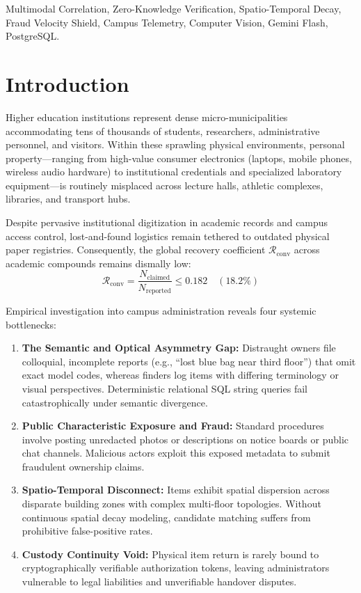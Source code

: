 \documentclass[conference]{IEEEtran}
\begin{document}
\begin{IEEEkeywords}
Multimodal Correlation, Zero-Knowledge Verification, Spatio-Temporal Decay, Fraud Velocity Shield, Campus Telemetry, Computer Vision, Gemini Flash, PostgreSQL.
\end{IEEEkeywords}

\section{Introduction}
Higher education institutions represent dense micro-municipalities accommodating tens of thousands of students, researchers, administrative personnel, and visitors. Within these sprawling physical environments, personal property—ranging from high-value consumer electronics (laptops, mobile phones, wireless audio hardware) to institutional credentials and specialized laboratory equipment—is routinely misplaced across lecture halls, athletic complexes, libraries, and transport hubs.

Despite pervasive institutional digitization in academic records and campus access control, lost-and-found logistics remain tethered to outdated physical paper registries. Consequently, the global recovery coefficient $\mathcal{R}_{\text{conv}}$ across academic compounds remains dismally low:
\begin{equation}
    \mathcal{R}_{\text{conv}} = \frac{N_{\text{claimed}}}{N_{\text{reported}}} \le 0.182 \quad (18.2\%)
\end{equation}

Empirical investigation into campus administration reveals four systemic bottlenecks:
\begin{enumerate}
    \item \textbf{The Semantic and Optical Asymmetry Gap:} Distraught owners file colloquial, incomplete reports (e.g., ``lost blue bag near third floor'') that omit exact model codes, whereas finders log items with differing terminology or visual perspectives. Deterministic relational SQL string queries fail catastrophically under semantic divergence.
    \item \textbf{Public Characteristic Exposure and Fraud:} Standard procedures involve posting unredacted photos or descriptions on notice boards or public chat channels. Malicious actors exploit this exposed metadata to submit fraudulent ownership claims.
    \item \textbf{Spatio-Temporal Disconnect:} Items exhibit spatial dispersion across disparate building zones with complex multi-floor topologies. Without continuous spatial decay modeling, candidate matching suffers from prohibitive false-positive rates.
    \item \textbf{Custody Continuity Void:} Physical item return is rarely bound to cryptographically verifiable authorization tokens, leaving administrators vulnerable to legal liabilities and unverifiable handover disputes.
\end{enumerate}
\end{document}

